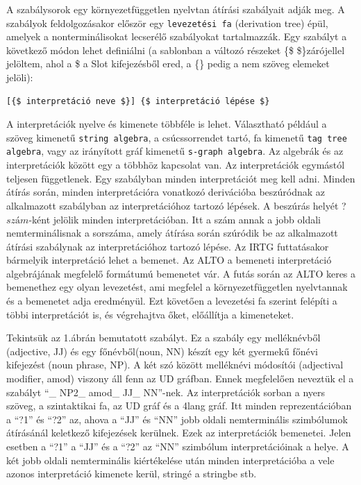 A szabálysorok egy környezetfüggetlen nyelvtan átírási szabályait adják meg. A szabályok feldolgozásakor először egy \texttt{levezetési fa} (derivation tree) épül, amelyek a nonterminálisokat lecserélő szabályokat tartalmazzák. Egy szabályt a következő módon lehet definiálni (a sablonban a változó részeket \{\$ \$\}zárójellel jelöltem, ahol a \$ a Slot kifejezésből ered, a \{\} pedig a nem szöveg elemeket jelöli):
\begin{verbatim}
[{$ interpretáció neve $}] {$ interpretáció lépése $}
\end{verbatim}
A interpretációk nyelve és kimenete többféle is lehet.  Választható például a szöveg kimenetű \texttt{string algebra}, a csúcssorrendet tartó, fa kimenetű \texttt{tag tree algebra}, vagy  az irányított gráf kimenetű \texttt{s-graph algebra}. Az algebrák és az interpretációk között egy a többhöz kapcsolat van. Az interpretációk egymástól teljesen függetlenek. Egy szabályban minden interpretációt meg kell adni. Minden átírás során, minden interpretációra vonatkozó derivációba beszúródnak az alkalmazott szabályban az interpretációhoz tartozó lépések. A beszúrás helyét ?{$  szám $}-ként jelölik minden interpretációban. Itt a szám annak a jobb oldali nemterminálisnak a sorszáma, amely átírása során szúródik be az alkalmazott átírási szabálynak az interpretációhoz tartozó lépése. Az IRTG futtatásakor bármelyik interpretáció lehet a bemenet. Az ALTO a bemeneti interpretáció algebrájának megfelelő formátumú bemenetet vár. A futás során az ALTO keres a bemenethez egy olyan levezetést, ami megfelel a környezetfüggetlen nyelvtannak és a bemenetet adja eredményül. Ezt követően a levezetési fa szerint felépíti a többi interpretációt is, és végrehajtva őket, előállítja a kimeneteket.

Tekintsük az 1.ábrán bemutatott szabályt. Ez a szabály egy melléknévből (adjective, JJ) és egy főnévből(noun, NN) készít egy két gyermekű főnévi kifejezést (noun phrase, NP). A két szó között melléknévi módosítói (adjectival modifier, amod) viszony áll fenn az UD gráfban. Ennek megfelelően neveztük el a szabályt “\_ NP2\_ amod\_ JJ\_ NN”-nek. Az interpretációk sorban a nyers szöveg, a szintaktikai fa, az UD gráf és a 4lang gráf.
Itt minden reprezentációban a “?1” és “?2” az, ahova a “JJ” és “NN” jobb oldali nemterminális szimbólumok átírásánál keletkező kifejezések kerülnek. Ezek az interpretációk bemenetei. Jelen esetben a “?1” a “JJ” és a “?2” az “NN” szimbólum interpretációinak a helye. A két jobb oldali nemterminális kiértékelése után minden interpretációba a vele azonos interpretáció kimenete kerül, stringé a stringbe stb.

